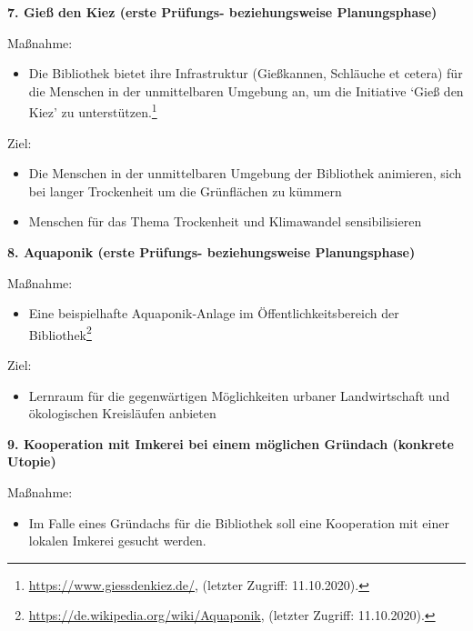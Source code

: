 \documentclass[a4paper,
fontsize=11pt,
oneside,
numbers=noperiodatend,
parskip=half-,
bibliography=totoc,
final
]{scrartcl}
\begin{document}
\textbf{7. Gieß den Kiez (erste Prüfungs- beziehungsweise
Planungsphase)}

Maßnahme:

\begin{itemize}[itemsep=-5pt]

\item
  Die Bibliothek bietet ihre Infrastruktur (Gießkannen, Schläuche et
  cetera) für die Menschen in der unmittelbaren Umgebung an, um die
  Initiative \enquote*{Gieß den Kiez} zu unterstützen.\footnote{\url{https://www.giessdenkiez.de/},
    (letzter Zugriff: 11.10.2020).}
\end{itemize}

Ziel:

\begin{itemize}[itemsep=-5pt]

\item
  Die Menschen in der unmittelbaren Umgebung der Bibliothek animieren,
  sich bei langer Trockenheit um die Grünflächen zu kümmern
\item
  Menschen für das Thema Trockenheit und Klimawandel sensibilisieren
\end{itemize}

\pagebreak
\textbf{8. Aquaponik (erste Prüfungs- beziehungsweise Planungsphase)}

Maßnahme:

\begin{itemize}[itemsep=-5pt]

\item
  Eine beispielhafte Aquaponik-Anlage im Öffentlichkeitsbereich der
  Bibliothek\footnote{\url{https://de.wikipedia.org/wiki/Aquaponik},
    (letzter Zugriff: 11.10.2020).}
\end{itemize}

Ziel:

\begin{itemize}[itemsep=-5pt]

\item
  Lernraum für die gegenwärtigen Möglichkeiten urbaner Landwirtschaft
  und ökologischen Kreisläufen anbieten
\end{itemize}

\textbf{9. Kooperation mit Imkerei bei einem möglichen Gründach
(konkrete Utopie)}

Maßnahme:

\begin{itemize}[itemsep=-5pt]

\item
  Im Falle eines Gründachs für die Bibliothek soll eine Kooperation mit
  einer lokalen Imkerei gesucht werden.
\end{itemize}
\end{document}

